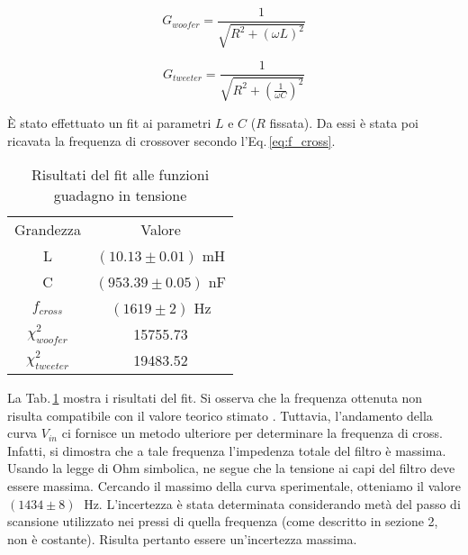 \documentclass[../Relazione_circuiti]{subfiles}
\begin{document}
  \begin{equation}
    \label{eq:gain_woofer}
    G_{woofer} = \frac{1}{\sqrt{R^2+(\omega L)^2}}
  \end{equation}

  \begin{equation}
    \label{eq:gain_tweeter}
    G_{tweeter} = \frac{1}{\sqrt{R^2+(\frac{1}{\omega C})^2}}
  \end{equation}



  È stato effettuato un fit ai parametri $L$ e $C$ ($R$ fissata).
  Da essi è stata poi ricavata la frequenza di crossover secondo l'Eq.\,\eqref{eq:f_cross}.

  \begin{table}[H]
    \centering

    \begin{tabular}{c | c }

      Grandezza          & Valore                 \\

      L                  & $(10.13 \pm 0.01)$ mH  \\
      C                  & $(953.39 \pm 0.05)$ nF \\
      $f_{cross}$        & $(1619 \pm 2)$ Hz      \\
      $\chi^2_{woofer}$  & 15755.73               \\
      $\chi^2_{tweeter}$ & 19483.52

    \end{tabular}

    \caption{Risultati del fit alle funzioni guadagno in tensione}
    \label{tab:fit_amplitude}

  \end{table}

  La Tab.\,\ref{tab:fit_amplitude} mostra i risultati del fit.
  Si osserva che la frequenza ottenuta non risulta compatibile con il valore teorico stimato \theoryF.
  Tuttavia, l'andamento della curva $V_{in}$ ci fornisce un metodo ulteriore per determinare la frequenza di cross.
  Infatti, si dimostra che a tale frequenza l'impedenza totale del filtro è massima.
  Usando la legge di Ohm simbolica, ne segue che la tensione ai capi del filtro deve essere massima.
  Cercando il massimo della curva sperimentale, otteniamo il valore $(1434 \pm 8) \;$ Hz.
  L'incertezza è stata determinata considerando metà del passo di scansione utilizzato nei pressi di quella frequenza
  (come descritto in sezione 2, non è costante). Risulta pertanto essere un'incertezza massima.
\end{document}
